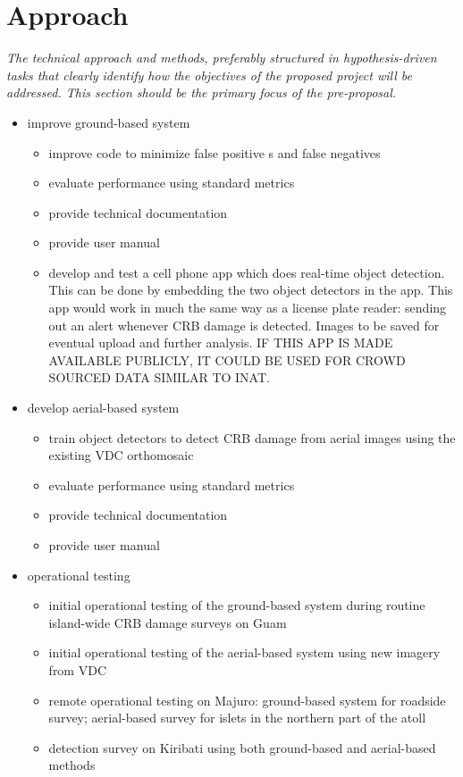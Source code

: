 \documentclass[11pt,letterpaper,english,bibliography=totocnumbered, abstract=on]{scrartcl}
\begin{document}
\section{Approach}

\textit{The technical approach and methods, preferably structured in hypothesis-driven tasks that clearly identify how the objectives of the proposed project will be addressed. This section should be the primary focus of the pre-proposal.}

\begin{itemize}
	
	\item improve ground-based system
	\begin{itemize}
		\item improve code to minimize false positive s and false negatives
		\item evaluate performance using standard metrics
		\item provide technical documentation
		\item provide user manual
		\item develop and test a cell phone app which does real-time object detection. This can be done by embedding the two object detectors in the app. This app would work in much the same way as a license plate reader: sending out an alert whenever CRB damage is detected. Images to be saved for eventual upload and further analysis. IF THIS APP IS MADE AVAILABLE PUBLICLY, IT COULD BE USED FOR CROWD SOURCED DATA SIMILAR TO INAT.
	\end{itemize}
	
	\item develop aerial-based system
	\begin{itemize}
		\item train object detectors to detect CRB damage from aerial images using the existing VDC orthomosaic
		\item evaluate performance using standard metrics
		\item provide technical documentation
		\item provide user manual
	\end{itemize}
	
	\item operational testing
	\begin{itemize}
		\item initial operational testing of the ground-based system during routine island-wide CRB damage surveys on Guam
		\item initial operational testing of the aerial-based system using new imagery from VDC
		\item remote operational testing on Majuro: ground-based system for roadside survey; aerial-based survey for islets in the northern part of the atoll
		\item detection survey on Kiribati using both ground-based and aerial-based methods		
	\end{itemize}
	
\end{itemize}
\end{document}
